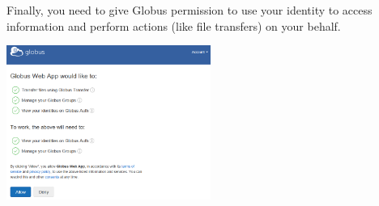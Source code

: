Finally, you need to give Globus permission to use your identity to access information and perform actions (like file transfers) on your behalf.

\begin{center}
\includegraphics[width=0.5\textwidth]{img/access-first-time-login-permissions.png}
\end{center}

